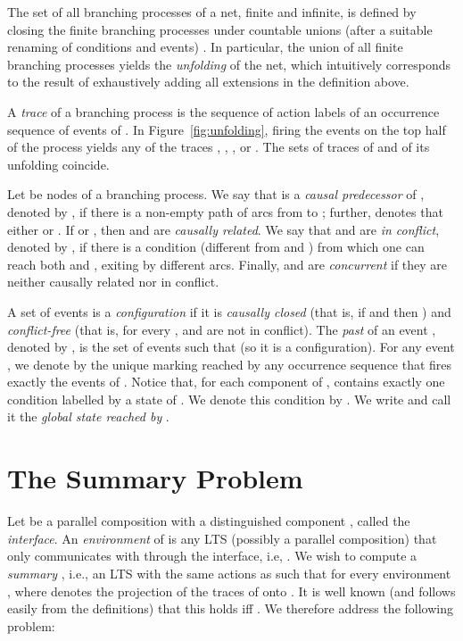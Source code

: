 \documentclass{llncs}
\begin{document}
The set of all branching processes of a net, finite and infinite, is defined by
closing the finite branching processes under countable unions (after a suitable renaming of conditions and events) \cite{Esparza08}.
In particular, the union of 
all finite branching processes yields the {\em unfolding} of the net, which 
intuitively corresponds to the result of exhaustively adding all extensions in the definition above. 

A {\em trace} of a branching process  is the sequence of action labels of an occurrence sequence of events of . In Figure~\ref{fig:unfolding},
firing the events on the top half of the process yields any of the traces 
, , , or .
The sets of traces of 
and of its unfolding coincide.

Let  be nodes of a branching process. We say that  is 
a \emph{causal predecessor} of , denoted by , if there is a non-empty path 
of arcs from  to ; further,
 denotes that either  or . If  or , then  and 
 are \emph{causally related}.
We say that  and  are \emph{in conflict}, denoted by , if there is a 
condition  (different from  and ) from which one can reach both  and , 
exiting  by different arcs.
Finally,  and  are \emph{concurrent} if they are neither causally related nor 
in conflict.

A set of events  is a \emph{configuration} if it is \emph{causally closed} (that is, 
if  and  then ) and \emph{conflict-free} (that is, for every 
,  and  are not in conflict). 
The \emph{past} of an event , denoted by , is the set of events  such 
that  (so it is a configuration). For any event ,  we denote by  the unique marking reached by 
any occurrence sequence that fires exactly the events of . 
Notice that, for each component  of ,  contains exactly one condition 
labelled by a state of . We denote this condition by .
We write  and call it the 
\emph{global state reached by }.


\section{The Summary Problem}

Let  be a parallel composition with a distinguished
component , called the {\em interface}. An {\em environment} of  is any LTS
 (possibly a parallel composition) that only communicates with  through the interface,
i.e, . We wish to
compute a {\em summary} , i.e., an LTS with the same actions as  such that 
 for every 
environment , where  denotes the projection of the traces of  onto 
. It is well known (and follows easily from the definitions) that this holds if{}f 
 \cite{Hoare85}. We therefore address the following problem:
\end{document}
